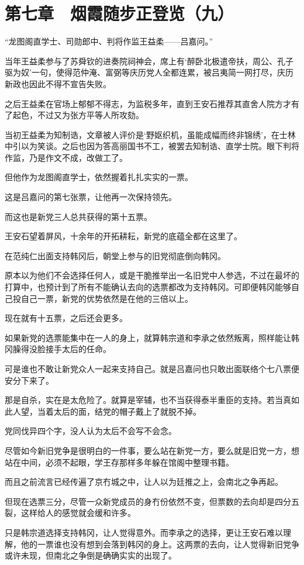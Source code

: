 \section{第七章　烟霞随步正登览（九）}

“龙图阁直学士、司勋郎中、判将作监王益柔——吕嘉问。”

当年王益柔参与了苏舜钦的进奏院祠神会，席上有‘醉卧北极遣帝扶，周公、孔子驱为奴’一句，使得范仲淹、富弼等庆历党人全都连累，被吕夷简一网打尽，庆历新政也因此不得不宣告失败。

之后王益柔在官场上郁郁不得志，为监税多年，直到王安石推荐其直舍人院方才有了起色，不过又为张方平等人所攻劾。

当初王益柔为知制诰，文章被人评价是‘野妪织机，虽能成幅而终非锦绣’，在士林中引以为笑谈。之后也因为答高丽国书不工，被罢去知制诰、直学士院。眼下判将作监，乃是作文不成，改做工了。

但他作为龙图阁直学士，依然握着扎扎实实的一票。

这是吕嘉问的第七张票，让他再一次保持领先。

而这也是新党三人总共获得的第十五票。

王安石望着屏风，十余年的开拓耕耘，新党的底蕴全都在这里了。

在范纯仁出面支持韩冈后，朝堂上参与的旧党彻底倒向韩冈。

原本以为他们不会选择任何人，或是干脆推举出一名旧党中人参选，不过在最坏的打算中，也预计到了所有不能确认去向的选票都改为支持韩冈。可即便韩冈能够自己投自己一票，新党的优势依然是在他的三倍以上。

现在就有十五票，之后还会更多。

如果新党的选票能集中在一人的身上，就算韩宗道和李承之依然叛离，照样能让韩冈臊得没脸接手太后的任命。

可是谁也不敢让新党众人一起来支持自己。就是吕嘉问也只敢出面联络个七八票便安分下来了。

那是自杀，实在是太危险了。就算是宰辅，也不当获得泰半重臣的支持。若当真如此人望，当着太后的面，结党的帽子戴上了就脱不掉。

党同伐异四个字，没人认为太后不会写不会念。

尽管如今新旧党争是很明白的一件事，要么站在新党一方，要么就是旧党一方，想站在中间，必须不起眼，学王存那样多年躲在馆阁中整理书籍。

而且之前流言已经传遍了京冇城之中，让人以为廷推之上，会南北之争再起。

但现在选票三分，尽管一众新党成员的身冇份依然不变，但票数的去向却是四分五裂，这样给人的感觉就会缓和许多。

只是韩宗道选择支持韩冈，让人觉得意外。而李承之的选择，更让王安石难以理解，他的一票谁也没有想到会落到韩冈的身上。这两票的去向，让人觉得新旧党争或许未现，但南北之争倒是确确实实的出现了。

